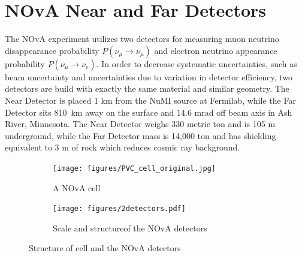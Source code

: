 \section{NOvA Near and Far Detectors}
The NOvA experiment utilizes two detectors for measuring muon neutrino disappearance probability 
$P(\nu_\mu \rightarrow \nu_\mu)$ and electron neutrino appearance probability $P(\nu_\mu \rightarrow \nu_e)$. 
In order to decrease systematic uncertainties, such as beam uncertainty and uncertainties due to variation
in detector efficiency, two detectors are build with exactly the same material and 
similar geometry. The Near Detector is placed 1 km from the NuMI source at Fermilab, while the 
Far Detector sits 810~km away on the surface and 14.6 mrad off beam axis in Ash River, Minnesota. 
The Near Detector weighs 330 metric ton and is 105 m underground, while the Far Detector mass is 
14,000 ton and has shielding equivalent to 3 m of rock which reduces cosmic ray background.
\begin{figure}
\begin{subfigure}{.2\textwidth}
  \centering
  \texttt{[image: figures/PVC\_cell\_original.jpg]}
  \caption{A NOvA cell}
  \label{cell}
\end{subfigure}%
\begin{subfigure}{.8\textwidth}
  \centering
  \texttt{[image: figures/2detectors.pdf]}
  \caption{Scale and structureof the NOvA detectors}
  \label{2detectors}
\end{subfigure}
\caption{Structure of cell and the NOvA detectors}
\label{cell_detectors}
\end{figure}

